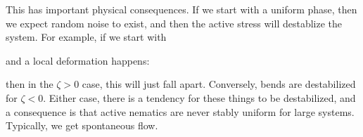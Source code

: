 \documentclass[a4paper]{article}
\begin{document}
This has important physical consequences. If we start with a uniform phase, then we expect random noise to exist, and then the active stress will destablize the system. For example, if we start with
\begin{center}
\end{center}
and a local deformation happens:
\begin{center}
\end{center}
then in the $\zeta > 0$ case, this will just fall apart. Conversely, bends are destabilized for $\zeta < 0$. Either case, there is a tendency for these things to be destabilized, and a consequence is that active nematics are never stably uniform for large systems. Typically, we get spontaneous flow.
\end{document}
